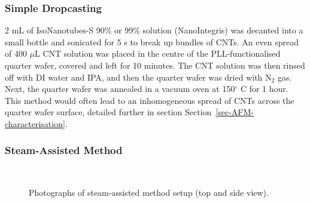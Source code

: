 \documentclass[
  a4paper,
]{scrbook}
\begin{document}
\hypertarget{simple-dropcasting}{%
\subsubsection*{Simple Dropcasting}\label{simple-dropcasting}}

2 mL of IsoNanotubes-S 90\% or 99\% solution (NanoIntegris) was decanted
into a small bottle and sonicated for 5 s to break up bundles of CNTs.
An even spread of 400 \(\mu\)L CNT solution was placed in the centre of
the PLL-functionalised quarter wafer, covered and left for 10 minutes.
The CNT solution was then rinsed off with DI water and IPA, and then the
quarter wafer was dried with N\(_2\) gas. Next, the quarter wafer was
annealed in a vacuum oven at 150\(^\circ\) C for 1 hour. This method
would often lead to an inhomogeneous spread of CNTs across the quarter
wafer surface, detailed further in section
Section~\ref{sec-AFM-characterisation}.

\hypertarget{steam-assisted-method}{%
\subsubsection*{Steam-Assisted Method}\label{steam-assisted-method}}

\begin{figure}

\begin{minipage}[t]{0.47\linewidth}

{\centering 


}

\end{minipage}%
%
\begin{minipage}[t]{0.05\linewidth}

{\centering 

~

}

\end{minipage}%
%
\begin{minipage}[t]{0.47\linewidth}

{\centering 


}

\end{minipage}%

\caption{\label{fig-steaming-method}Photographs of steam-assisted method
setup (top and side view).}

\end{figure}
\end{document}
